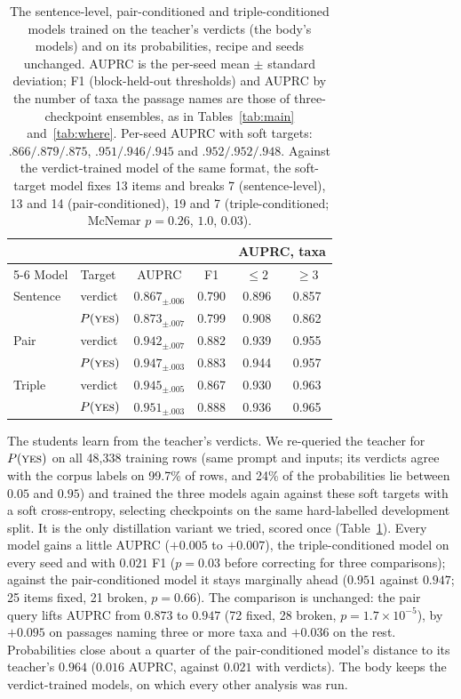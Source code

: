 \documentclass[11pt]{article}
\begin{document}
\begin{table}[t]\centering\small
\setlength{\tabcolsep}{2.8pt}
\begin{tabular}{llcccc}
\toprule
 & & & & \multicolumn{2}{c}{AUPRC, taxa} \\
\cmidrule(lr){5-6}
Model & Target & AUPRC & F1 & $\le 2$ & $\ge 3$ \\
\midrule
Sentence & verdict & $0.867_{\pm .006}$ & 0.790 & 0.896 & 0.857 \\
         & $P(\textsc{yes})$ & $0.873_{\pm .007}$ & 0.799 & 0.908 & 0.862 \\
Pair     & verdict & $0.942_{\pm .007}$ & 0.882 & 0.939 & 0.955 \\
         & $P(\textsc{yes})$ & $0.947_{\pm .003}$ & 0.883 & 0.944 & 0.957 \\
Triple   & verdict & $0.945_{\pm .005}$ & 0.867 & 0.930 & 0.963 \\
         & $P(\textsc{yes})$ & $0.951_{\pm .003}$ & 0.888 & 0.936 & 0.965 \\
\bottomrule
\end{tabular}
\caption{The sentence-level, pair-conditioned and triple-conditioned models trained on the
teacher's verdicts (the body's models) and on its probabilities, recipe and seeds unchanged. AUPRC
is the per-seed mean $\pm$ standard deviation; F1 (block-held-out thresholds) and AUPRC by the
number of taxa the passage names are those of three-checkpoint ensembles, as in
Tables~\ref{tab:main} and~\ref{tab:where}. Per-seed AUPRC with soft targets: $.866/.879/.875$,
$.951/.946/.945$ and $.952/.952/.948$. Against the verdict-trained model of the same format, the
soft-target model fixes 13 items and breaks 7 (sentence-level), 13 and 14 (pair-conditioned), 19
and 7 (triple-conditioned; McNemar $p = 0.26$, $1.0$, $0.03$).}
\label{tab:soft}
\end{table}

The students learn from the teacher's verdicts. We re-queried the teacher for $P(\textsc{yes})$ on
all 48{,}338 training rows (same prompt and inputs; its verdicts agree with the corpus labels on
99.7\% of rows, and 24\% of the probabilities lie between $0.05$ and $0.95$) and trained the three
models again against these soft targets with a soft cross-entropy, selecting checkpoints on the
same hard-labelled development split. It is the only distillation variant we tried, scored once
(Table~\ref{tab:soft}). Every model gains a little AUPRC ($+0.005$ to $+0.007$), the
triple-conditioned model on every seed and with $0.021$ F1 ($p = 0.03$ before correcting for three
comparisons); against the pair-conditioned model it stays marginally ahead ($0.951$ against
$0.947$; 25 items fixed, 21 broken, $p = 0.66$). The comparison is unchanged: the pair query lifts
AUPRC from $0.873$ to $0.947$ (72 fixed, 28 broken, $p = 1.7\times10^{-5}$), by $+0.095$ on passages
naming three or more taxa and $+0.036$ on the rest. Probabilities close about a quarter of the
pair-conditioned model's distance to its teacher's $0.964$ ($0.016$ AUPRC, against $0.021$ with
verdicts). The body keeps the verdict-trained models, on which every other analysis was run.
\end{document}
